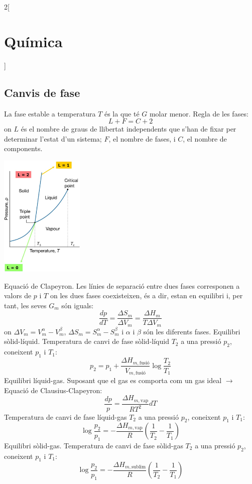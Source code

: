 \documentclass[../../../main.tex]{subfiles}
\begin{document}
\begin{multicols}{2}[\section{Química}]
\subsection{Canvis de fase}
La fase estable a temperatura $T$ és la que té $G$ molar menor.\newline
Regla de les fases: $$L+F=C+2$$
{\footnotesize on $L$ és el nombre de graus de llibertat independents que s’han de fixar per determinar l’estat d’un sistema; $F$, el nombre de fases, i $C$, el nombre de components.}\newline
\begin{minipage}{\linewidth} 
    \centering
    \includegraphics[width=4cm]{Physics/1st/Chemistry/Images/fases.jpg} 
\end{minipage}
Equació de Clapeyron. Les línies de separació entre dues fases corresponen a valors de $p$ i $T$ on les dues fases coexisteixen, és a dir, estan en equilibri i, per tant, les seves $G_m$ són iguals: $$\frac{dp}{dT}=\frac{\Delta S_m}{\Delta V_m}=\frac{\Delta H_m}{T\Delta V_m}$$ {\footnotesize on $\Delta V_m=V_m^\alpha-V_m^\beta$,  $\Delta S_m=S_m^\alpha-S_m^\beta$ i $\alpha$ i $\beta$ són les diferents fases.}\newline
Equilibri sòlid-líquid. Temperatura de canvi de fase sòlid-líquid $T_2$ a una pressió $p_2$, coneixent $p_1$ i $T_1$:
$$p_2=p_1+\frac{\Delta H_{m,\text{fusió}}}{V_{m,\text{fusió}}}\log\frac{T_2}{T_1}$$
Equilibri líquid-gas. Suposant que el gas es comporta com un gas ideal $\rightarrow$ Equació de Clausius-Clapeyron: $$\frac{dp}{p}=\frac{\Delta H_{m,\text{vap}}}{RT^2}dT$$
Temperatura de canvi de fase líquid-gas $T_2$ a una pressió $p_2$, coneixent $p_1$ i $T_1$: $$\log\frac{p_2}{p_1}=-\frac{\Delta H_{m,\text{vap}}}{R}\left(\frac{1}{T_2}-\frac{1}{T_1}\right)$$
Equilibri sòlid-gas. Temperatura de canvi de fase sòlid-gas $T_2$ a una pressió $p_2$, coneixent $p_1$ i $T_1$: $$\log\frac{p_2}{p_1}=-\frac{\Delta H_{m,\text{sublim}}}{R}\left(\frac{1}{T_2}-\frac{1}{T_1}\right)$$

\end{multicols}
\end{document}
